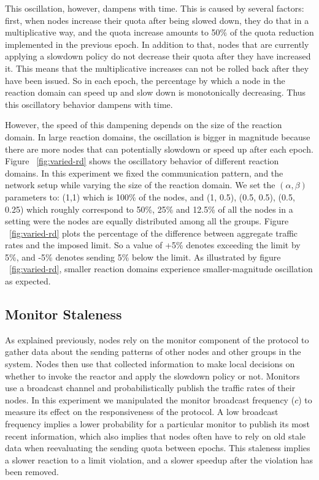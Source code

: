 This oscillation, however, dampens with time. This is caused by several factors: first, when nodes increase their quota after being slowed down, they do that in a multiplicative way, and the quota increase amounts to 50\% of the quota reduction implemented in the previous epoch. In addition to that, nodes that are currently applying a slowdown policy do not decrease their quota after they have increased it. This means that the multiplicative increases can not be rolled back after they have been issued. So in each epoch, the percentage by which a node in the reaction domain can speed up and slow down is monotonically decreasing. Thus this oscillatory behavior dampens with time.

However, the speed of this dampening depends on the size of the reaction domain. In large reaction domains, the oscillation is bigger in magnitude because there are more nodes that can potentially slowdown or speed up after each epoch. Figure ~\ref{fig:varied-rd} shows the oscillatory behavior of different reaction domains. In this experiment we fixed the communication pattern, and the network setup while varying the size of the reaction domain. We set the $(\alpha, \beta)$ parameters to: (1,1) which is 100\% of the nodes, and (1, 0.5), (0.5, 0.5), (0.5, 0.25) which roughly correspond to 50\%, 25\% and 12.5\% of all the nodes in a setting were the nodes are equally distributed among all the groups. Figure ~\ref{fig:varied-rd} plots the percentage of the difference between aggregate traffic rates and the imposed limit. So a value of +5\% denotes exceeding the limit by 5\%, and -5\% denotes sending 5\% below the limit. As illustrated by figure ~\ref{fig:varied-rd}, smaller reaction domains experience smaller-magnitude oscillation as expected.




\subsection{Monitor Staleness}

As explained previously, nodes rely on the monitor component of the protocol to gather data about the sending patterns of other nodes and other groups in the system. Nodes then use that collected information to make local decisions on whether to invoke the reactor and apply the slowdown policy or not. Monitors use a broadcast channel and probabilistically publish the traffic rates of their nodes. In this experiment we manipulated the monitor broadcast frequency ($c$) to measure its effect on the responsiveness of the protocol. A low broadcast frequency implies a lower probability for a particular monitor to publish its most recent information, which also implies that nodes often have to rely on old stale data when reevaluating the sending quota between epochs. This staleness implies a slower reaction to a limit violation, and a slower speedup after the violation has been removed.

